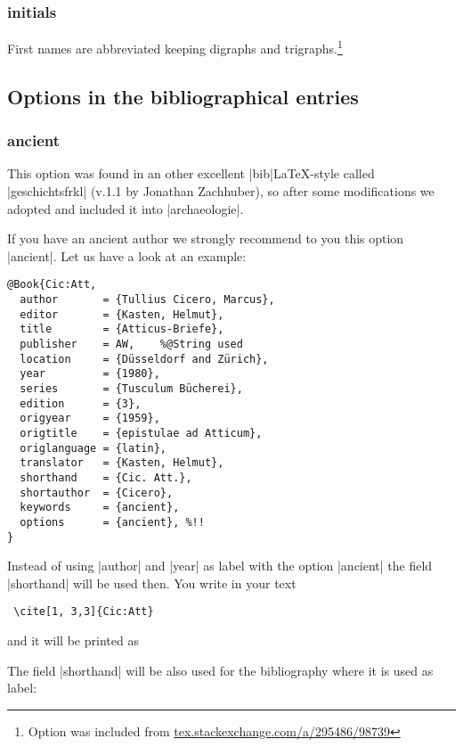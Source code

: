 \documentclass[a4paper,
10pt,
greek,
french,
spanish,
italian,
ngerman,
english
]{ltxdoc}
\begin{document}
 \subsubsection{initials}\label{initials}
 First names are abbreviated  keeping digraphs and trigraphs.\footnote{Option was included from \href{http://tex.stackexchange.com/a/295486/98739}{tex.stackexchange.com/a/295486/98739}}


\subsection{Options in the bibliographical entries}\label{optionen-literatur}
\subsubsection{ancient}\label{ancient}
This option was found in an other excellent |bib|\LaTeX-style called  |geschichtsfrkl| (v.1.1 by Jonathan Zachhuber), so after some modifications we adopted and included it into |archaeologie|.
 
 If you have an ancient author we strongly recommend to you this option  |ancient|.
Let us have a look at an example:
\begin{lstlisting}[style=bibentry,label=Cic:Att,caption={{@}Book\{Cic:Att,…\} }]
@Book{Cic:Att,
  author       = {Tullius Cicero, Marcus},
  editor       = {Kasten, Helmut},
  title        = {Atticus-Briefe},
  publisher    = AW, 	%@String used
  location     = {Düsseldorf and Zürich},
  year         = {1980},
  series       = {Tusculum Bücherei},
  edition      = {3},
  origyear     = {1959},
  origtitle    = {epistulae ad Atticum},
  origlanguage = {latin},
  translator   = {Kasten, Helmut},
  shorthand    = {Cic. Att.},
  shortauthor  = {Cicero},
  keywords     = {ancient},
  options      = {ancient}, %!!
}
\end{lstlisting}
Instead of using  |author| and |year| as label with the option |ancient| the field |shorthand| will be used then.
You write in your text
 \begin{lstlisting}
 \cite[1, 3,3]{Cic:Att}\end{lstlisting} 
and it will be printed as
 \begin{refsection}
\begin{bsp}
\cite[1, 3,3]{Cic:Att}
\end{bsp}\end{refsection}
The field |shorthand| will be also used for the bibliography where it is used as label:
\end{document}
